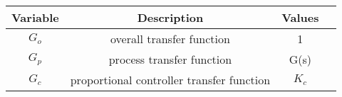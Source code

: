 \begin{tabular}{|c|c|c|c}
    \hline
    \textbf{Variable} & \textbf{Description} & \textbf{Values}\\
    \hline
    $G_o$ & overall transfer function & 1\\
    \hline
    $G_p$ & process transfer function & G(s)\\
    \hline
    $G_c$ & proportional controller transfer function & $K_c$\\
    \hline
\end{tabular}
